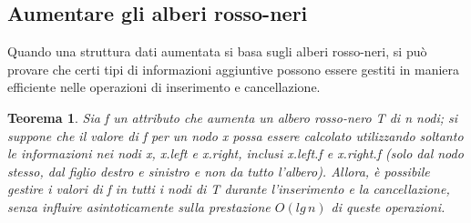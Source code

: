 \documentclass[10pt, a4paper]{report}
\newtheorem{theorem}{Teorema}[chapter]
\begin{document}
\subsection{Aumentare gli alberi rosso-neri}
Quando una struttura dati aumentata si basa sugli alberi rosso-neri, si può provare che certi tipi di informazioni aggiuntive possono essere gestiti in maniera efficiente nelle operazioni di inserimento e cancellazione.
\begin{theorem}
Sia \textit{f} un attributo che aumenta un albero rosso-nero \textit{T} di \textit{n} nodi; si suppone che il valore di \textit{f} per un nodo \textit{x} possa essere calcolato utilizzando soltanto le informazioni nei nodi \textit{x}, \textit{x.left} e \textit{x.right}, inclusi \textit{x.left.f} e \textit{x.right.f} (solo dal nodo stesso, dal figlio destro e sinistro e non da tutto l'albero). Allora, è possibile gestire i valori di \textit{f} in tutti i nodi di \textit{T} durante l'inserimento e la cancellazione, senza influire asintoticamente sulla prestazione $O(lg\,n)$ di queste operazioni.
\end{theorem}
\end{document}
